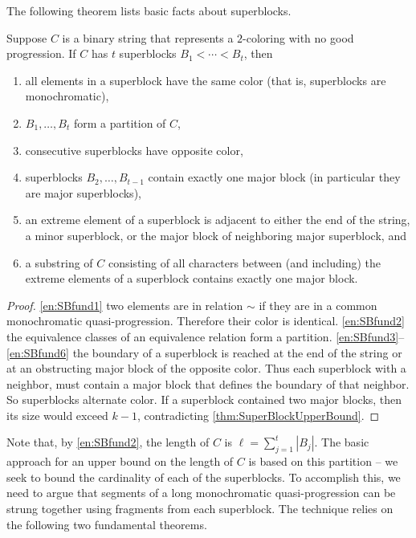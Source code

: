 The following theorem lists basic facts about superblocks.

\begin{theorem}\label{thm:Fundamentals} Suppose $C$ is a binary string that represents a $2$-coloring with no good progression. If $C$ has $t$ superblocks $B_1 <\cdots < B_t$, then
\begin{enumerate}
\item\label{en:SBfund1} all elements in a superblock have the same color (that is, superblocks are monochromatic),
\item\label{en:SBfund2} $B_1,\ldots,B_t$ form a partition of $C$, 
\item\label{en:SBfund3} consecutive superblocks have opposite color, 
\item\label{en:SBfund4} superblocks $B_2,\ldots,B_{t-1}$ contain exactly one major block (in particular they are major superblocks), 
\item\label{en:SBfund5} an extreme element of a superblock is adjacent to either the end of the string, a minor superblock, or the major block of neighboring major superblock, and
\item\label{en:SBfund6} a substring of $C$ consisting of all characters between (and including) the extreme elements of a superblock contains exactly one major block.
\end{enumerate}
\end{theorem}
\begin{proof} \ref{en:SBfund1} two elements are in relation $\sim$ if they are in a common monochromatic quasi-progression. Therefore their color is identical. \ref{en:SBfund2} the equivalence classes of an equivalence relation form a partition. \ref{en:SBfund3}--\ref{en:SBfund6} the boundary of a superblock is reached at the end of the string or at an obstructing major block of the opposite color. Thus each superblock with a neighbor, must contain a major block that defines the boundary of that neighbor. So superblocks alternate color. If a superblock contained two major blocks, then its size would exceed $k-1$, contradicting \autoref{thm:SuperBlockUpperBound}.
\end{proof}

Note that, by \ref{en:SBfund2}, the length of $C$ is $\ell = \sum_{j=1}^t |B_j|$. The basic approach for an upper bound on the length of $C$ is based on this partition -- we seek to bound the cardinality of each of the superblocks. To accomplish this, we need to argue that segments of a long monochromatic quasi-progression can be strung together using fragments from each superblock. The technique relies on the following two fundamental theorems.

